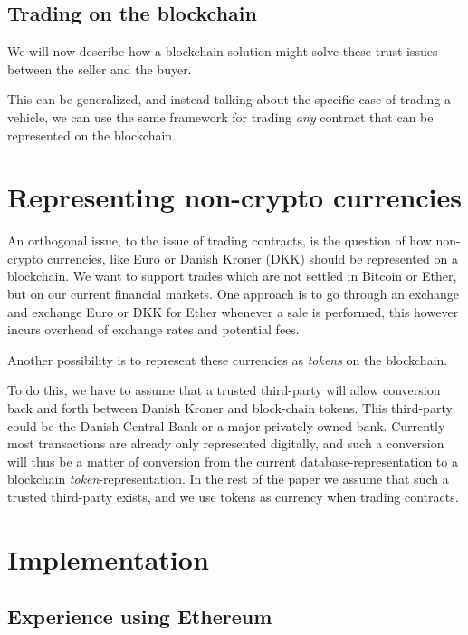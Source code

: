 \documentclass[oneside,a4paper,10pts,article]{memoir}
\begin{document}
\section{Trading on the blockchain}
We will now describe how a blockchain solution might solve these trust
issues between the seller and the buyer. 



This can be generalized, and instead talking about the specific case
of trading a vehicle, we can use the same framework for trading
\textit{any} contract that can be represented on the blockchain.

\chapter{Representing non-crypto currencies}
\label{sec:currency}
An orthogonal issue, to the issue of trading contracts, is the
question of how non-crypto currencies, like Euro or Danish Kroner
(DKK) should be represented on a blockchain. We want to support trades
which are not settled in Bitcoin or Ether, but on our current
financial markets. One approach is to go through an exchange and
exchange Euro or DKK for Ether whenever a sale is performed, this
however incurs overhead of exchange rates and potential fees.

Another possibility is to represent these currencies as
\textit{tokens} on the blockchain. 

To do this, we have to assume that a trusted third-party will allow
conversion back and forth between Danish Kroner and block-chain
tokens. This third-party could be the Danish Central Bank or a major
privately owned bank. Currently most transactions are already only
represented digitally, and such a conversion will thus be a matter of
conversion from the current database-representation to a blockchain
\emph{token}-representation. In the rest of the paper we assume that
such a trusted third-party exists, and we use tokens as currency when
trading contracts.

\chapter{Implementation}
\label{sec:implementation}


\section{Experience using Ethereum}
\end{document}
